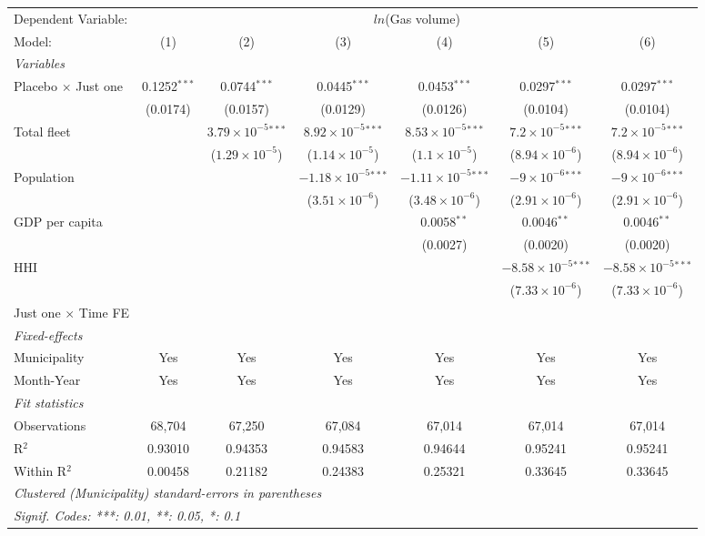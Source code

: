 \documentclass[
]{article}
\begin{document}
\begin{tabular}{lcccccc}
\tabularnewline\midrule\midrule
Dependent Variable:&\multicolumn{6}{c}{$ln$(Gas volume)}\\
Model:&(1) & (2) & (3) & (4) & (5) & (6)\\
\midrule \emph{Variables}&   &   &   &   &   &  \\
Placebo $\times $ Just one & 0.1252$^{***}$ & 0.0744$^{***}$ & 0.0445$^{***}$ & 0.0453$^{***}$ & 0.0297$^{***}$ & 0.0297$^{***}$\\
  &(0.0174) & (0.0157) & (0.0129) & (0.0126) & (0.0104) & (0.0104)\\
Total fleet &    & $3.79\times 10^{-5}$$^{***}$ & $8.92\times 10^{-5}$$^{***}$ & $8.53\times 10^{-5}$$^{***}$ & $7.2\times 10^{-5}$$^{***}$ & $7.2\times 10^{-5}$$^{***}$\\
  &   & ($1.29\times 10^{-5}$) & ($1.14\times 10^{-5}$) & ($1.1\times 10^{-5}$) & ($8.94\times 10^{-6}$) & ($8.94\times 10^{-6}$)\\
Population &    &    & $-1.18\times 10^{-5}$$^{***}$ & $-1.11\times 10^{-5}$$^{***}$ & $-9\times 10^{-6}$$^{***}$ & $-9\times 10^{-6}$$^{***}$\\
  &   &    & ($3.51\times 10^{-6}$) & ($3.48\times 10^{-6}$) & ($2.91\times 10^{-6}$) & ($2.91\times 10^{-6}$)\\
GDP per capita &    &    &    & 0.0058$^{**}$ & 0.0046$^{**}$ & 0.0046$^{**}$\\
  &   &    &    & (0.0027) & (0.0020) & (0.0020)\\
HHI &    &    &    &    & $-8.58\times 10^{-5}$$^{***}$ & $-8.58\times 10^{-5}$$^{***}$\\
  &   &    &    &    & ($7.33\times 10^{-6}$) & ($7.33\times 10^{-6}$)\\
Just one $\times$ Time FE &  &  &  &  &  & \\
\midrule \emph{Fixed-effects}&   &   &   &   &   &  \\
Municipality & Yes & Yes & Yes & Yes & Yes & Yes\\
Month-Year & Yes & Yes & Yes & Yes & Yes & Yes\\
\midrule \emph{Fit statistics}&  & & & & & \\
Observations & 68,704&67,250&67,084&67,014&67,014&67,014\\
R$^2$ & 0.93010&0.94353&0.94583&0.94644&0.95241&0.95241\\
Within R$^2$ & 0.00458&0.21182&0.24383&0.25321&0.33645&0.33645\\
\midrule\midrule\multicolumn{7}{l}{\emph{Clustered (Municipality) standard-errors in parentheses}}\\
\multicolumn{7}{l}{\emph{Signif. Codes: ***: 0.01, **: 0.05, *: 0.1}}\\
\end{tabular}
\end{document}
